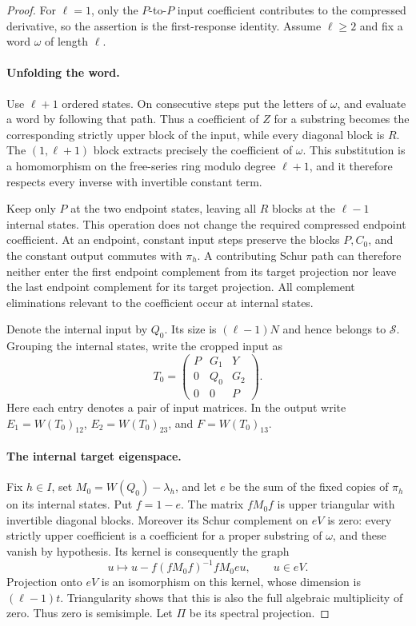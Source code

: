 \documentclass[11pt]{article}
\theoremstyle{definition}
\theoremstyle{remark}
\numberwithin{equation}{section}
\begin{document}
\begin{proof}
For $\ell=1$, only the $P$-to-$P$ input coefficient contributes to the
compressed derivative, so the assertion is the first-response identity.
Assume $\ell\ge2$ and fix a word $\omega$ of length $\ell$.

\paragraph{Unfolding the word.}
Use $\ell+1$ ordered states.  On consecutive steps put the letters of
$\omega$, and evaluate a word by following that path.  Thus a coefficient
of $Z$ for a substring becomes the corresponding strictly upper block of
the input, while every diagonal block is $R$.  The $(1,\ell+1)$ block
extracts precisely the coefficient of $\omega$.  This substitution is a
homomorphism on the free-series ring modulo degree $\ell+1$, and it
therefore respects every inverse with invertible constant term.

Keep only $P$ at the two endpoint states, leaving all $R$ blocks at the
$\ell-1$ internal states.  This operation does not change the required
compressed endpoint coefficient.  At an endpoint, constant input steps
preserve the blocks $P,C_0$, and the constant output commutes with
$\pi_h$.  A contributing Schur path can therefore neither enter the
first endpoint complement from its target projection nor leave the last
endpoint complement for its target projection.  All complement
eliminations relevant to the coefficient occur at internal states.

Denote the internal input by $Q_0$.  Its size is $(\ell-1)N$ and hence
belongs to $\mathcal S$.  Grouping the internal
states, write the cropped input as
\[
 T_0=\begin{pmatrix}
 P&G_1&Y\\0&Q_0&G_2\\0&0&P
 \end{pmatrix}.
\]
Here each entry denotes a pair of input matrices.  In the output write
$E_1=W(T_0)_{12}$, $E_2=W(T_0)_{23}$, and $F=W(T_0)_{13}$.

\paragraph{The internal target eigenspace.}
Fix $h\in I$, set $M_0=W(Q_0)-\lambda_h$, and let $e$ be the sum of the
fixed copies of $\pi_h$ on its internal states.  Put $f=1-e$.
The matrix $fM_0f$ is upper triangular with invertible diagonal blocks.
Moreover its Schur complement on $eV$ is zero: every strictly upper
coefficient is a coefficient for a proper substring of $\omega$, and
these vanish by hypothesis.  Its kernel is consequently the graph
\[
 u\longmapsto u-f(fM_0f)^{-1}fM_0e u,
 \qquad u\in eV.
\]
Projection onto $eV$ is an isomorphism on this kernel, whose dimension is
$(\ell-1)t$.  Triangularity shows that this is also the full algebraic
multiplicity of zero.  Thus zero is semisimple.  Let $\Pi$ be its
spectral projection.


\end{proof}
\end{document}
